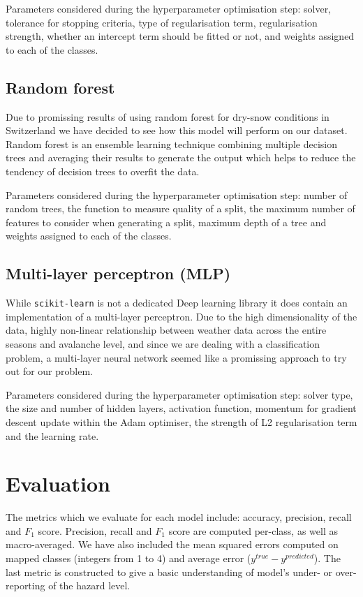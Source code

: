 \documentclass{article}
\begin{document}
	Parameters considered during the hyperparameter optimisation step: solver, tolerance for stopping criteria, type of regularisation term, regularisation strength, whether an intercept term should be fitted or not, and weights assigned to each of the classes.

\subsection{Random forest}
	Due to promissing results of \cite{nhess-22-2031-2022} using random forest for dry-snow conditions in Switzerland we have decided to see how this model will perform on our dataset. Random forest is an ensemble learning technique combining multiple decision trees and averaging their results to generate the output which helps to reduce the tendency of decision trees to overfit the data.

	Parameters considered during the hyperparameter optimisation step: number of random trees, the function to measure quality of a split, the maximum number of features to consider when generating a split, maximum depth of a tree and weights assigned to each of the classes.

\subsection{Multi-layer perceptron (MLP)}
	While \texttt{scikit-learn} is not a dedicated Deep learning library it does contain an implementation of a multi-layer perceptron. Due to the high dimensionality of the data, highly non-linear relationship between weather data across the entire seasons and avalanche level, and since we are dealing with a classification problem, a multi-layer neural network seemed like a promissing approach to try out for our problem.

	Parameters considered during the hyperparameter optimisation step: solver type, the size and number of hidden layers, activation function, momentum for gradient descent update within the Adam optimiser, the strength of L2 regularisation term and the learning rate.

\section{Evaluation}\label{sec:evaluation}

The metrics which we evaluate for each model include: accuracy, precision, recall and $F_1$ score. Precision, recall and $F_1$ score are computed per-class, as well as macro-averaged.
\newline
We have also included the mean squared errors computed on mapped classes (integers from 1 to 4) and average error ($y^{true} - y^{predicted}$). The last metric is constructed to give a basic understanding of model's under- or over-reporting of the hazard level.
\end{document}
